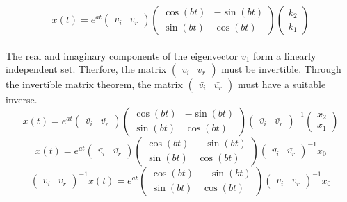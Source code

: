 \documentclass[a4paper, 12pt]{report}
\def\dst{\displaystyle}
\def\b{\bar}
\begin{document}
\begin{center}
$$x(t) = e^{at}\begin{pmatrix}\b{v_i} & \b{v_r} \end{pmatrix} \begin{pmatrix} \cos{(bt)}& -\sin{(bt)} \\ \sin{(bt)}& \cos{(bt)} \end{pmatrix} \begin{pmatrix} k_2 \\ k_1\end{pmatrix}$$
\\The real and imaginary components of the eigenvector $v_1$ form a linearly independent set. Therfore, the matrix $\dst{\begin{pmatrix}\b{v_i} & \b{v_r} \end{pmatrix}}$ must be invertible. Through the invertible matrix theorem, the matrix $\dst{\begin{pmatrix}\b{v_i} & \b{v_r} \end{pmatrix}}$ must have a suitable inverse. 
 $$x(t) = e^{at}\begin{pmatrix}\b{v_i} & \b{v_r} \end{pmatrix} \begin{pmatrix} \cos{(bt)}& -\sin{(bt)} \\ \sin{(bt)}& \cos{(bt)} \end{pmatrix} \begin{pmatrix}\b{v_i} & \b{v_r} \end{pmatrix}^{-1}  \begin{pmatrix} x_2 \\ x_1\end{pmatrix}$$
 $$x(t) = e^{at}\begin{pmatrix}\b{v_i} & \b{v_r} \end{pmatrix} \begin{pmatrix} \cos{(bt)}& -\sin{(bt)} \\ \sin{(bt)}& \cos{(bt)} \end{pmatrix} \begin{pmatrix}\b{v_i} & \b{v_r} \end{pmatrix}^{-1}  x_0$$
$$\begin{pmatrix}\b{v_i} & \b{v_r} \end{pmatrix}^{-1}x(t) = e^{at} \begin{pmatrix} \cos{(bt)}& -\sin{(bt)} \\ \sin{(bt)}& \cos{(bt)} \end{pmatrix} \begin{pmatrix}\b{v_i} & \b{v_r} \end{pmatrix}^{-1}  x_0$$

\end{center}
\end{document}
